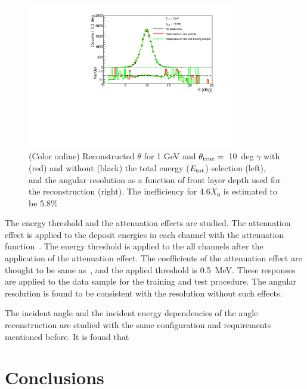\documentclass[jkps,preprint,fleqn,showpacs,showkeys]{revtex4}
\begin{document}
\begin{figure}[!hbt]
\includegraphics[width=0.8\textwidth]{figures/Fig4_reco_ecut.pdf}
\caption{ (Color online) Reconstructed $\theta$ for 1 GeV and $\theta_{\rm{true}}=$~10~deg $\gamma$ with (red) and without (black) the total energy ($E_{\rm{tot}}$) selection (left), and the angular resolution as a function of front layer depth used for the reconstruction (right). The inefficiency for 4.6$X_{0}$ is estimated to be 5.8\%  }
\label{fig:angle_reco_layer}
\end{figure}

The energy threshold and the attenuation effects are studied. The attenuation effect is applied to the deposit energies in each channel with the attenuation function~\cite{Murayama:2020mcp}. The energy threshold is applied to the all channels after the application of the attenuation effect. The coefficients of the attenuation effect are thought to be same as~\cite{Murayama:2020mcp}, and the applied threshold is 0.5~MeV. These responses are applied to the data sample for the training and test procedure. The angular resolution is found to be consistent with the resolution without such effects.



The incident angle and the incident energy dependencies of the angle reconstruction are studied with the same configuration and requirements mentioned before. It is found that 




\section{Conclusions}

\label{sec:con}



\begin{acknowledgments}
\end{acknowledgments}


\end{document}
